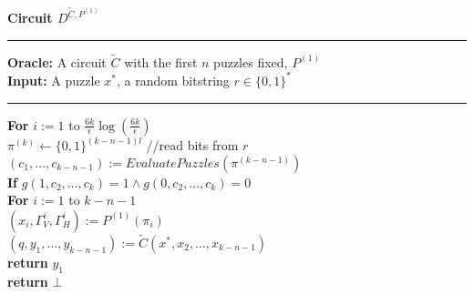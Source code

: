 %
%
%
\begin{codeblock}
  \textbf{Circuit $D^{\widetilde{C}, P^{(1)}}$}
  \medskip

  \hrule

  \medskip

  \textbf{Oracle:} A circuit $\widetilde{C}$ with the first $n$ puzzles fixed, $P^{(1)}$\\
  \textbf{Input:} A puzzle $x^*$, a random bitstring $r \in \{0,1\}^{*}$

  \medskip\hrule\medskip
  \textbf{For} $i:=1$ to $\frac{6k}{\epsilon} \log(\frac{6k}{\epsilon})$\\
  \IndI $\pi^{(k)} \leftarrow \{0,1\}^{(k-n-1)l}$ //read bits from $r$  \\
  \IndI $(c_1, \dots, c_{k-n-1}) := EvaluatePuzzles(\pi^{(k-n-1)})$\\
  \IndI \textbf{If} $g(1,c_2, \dots, c_k) =1 \land g(0,c_2, \dots, c_k) = 0$\\
  \IndII \textbf{For} $i:=1$ to $k-n-1$\\
  \IndIII $(x_i, \Gamma_V^{i}, \Gamma_H^{i}) := P^{(1)}(\pi_i)$\\
  \IndII $(q, y_1, \dots, y_{k-n-1}) := \widetilde{C}(x^*, x_2, \dots, x_{k-n-1})$\\
  \IndII \textbf{return} $y_1$\\
  \textbf{return} $\bot$ \\

\end{codeblock}
%
